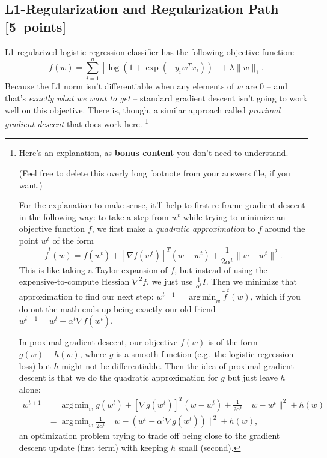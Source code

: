 \documentclass{article}
\newcommand\pts[1]{\textcolor{pointscolour}{[#1~points]}}
\DeclareMathOperator*{\argmin}{arg\,min}
\newcommand{\norm}[1]{\lVert #1 \rVert}
\begin{document}
\subsection{L1-Regularization and Regularization Path \pts{5}}
L1-regularized logistic regression classifier has the following objective function:
\[
f(w) = \sum_{i=1}^n \left[\log(1+\exp(-y_iw^Tx_i))\right] + \lambda\norm{w}_1.
\]
Because the L1 norm isn't differentiable when any elements of $w$ are $0$ -- and that's \emph{exactly what we want to get} -- standard gradient descent isn't going to work well on this objective.
There is, though, a similar approach called \emph{proximal gradient descent} that does work here.%
\footnote{%
    Here's an explanation, as \textbf{bonus content} you don't need to understand.

    (Feel free to delete this overly long footnote from your answers file, if you want.)

    For the explanation to make sense, it'll help to first re-frame gradient descent in the following way:
    to take a step from $w^t$ while trying to minimize an objective function $f$,
    we first make a \emph{quadratic approximation} to $f$ around the point $w^t$ of the form
    \[
        \tilde f^t(w) = f(w^t) + [\nabla f(w^t)]^T (w - w^t) + \frac{1}{2 \alpha^t} \norm{w - w^t}^2
    .\]
    This is like taking a Taylor expansion of $f$,
    but instead of using the expensive-to-compute Hessian $\nabla^2 f$,
    we just use $\frac{1}{\alpha^t} I$.
    Then we minimize that approximation to find our next step:
    $w^{t+1} = \argmin_{w} \tilde{f}^t(w)$,
    which if you do out the math ends up being exactly our old friend $w^{t+1} = w^t - \alpha^t \nabla f(w^t)$.\footnotemark

    In proximal gradient descent, our objective $f(w)$ is of the form $g(w) + h(w)$,
    where $g$ is a smooth function (e.g.\ the logistic regression loss)
    but $h$ might not be differentiable.
    Then the idea of proximal gradient descent is that we do the quadratic approximation for $g$ but just leave $h$ alone:
    \begin{align*}
         w^{t+1}
      &= \argmin_w g(w^t) + [\nabla g(w^t)]^T (w - w^t) + \frac{1}{2 \alpha^t} \norm{w - w^t}^2 + h(w)
    \\&= \argmin_w \frac{1}{2 \alpha^t} \norm{w - (w^t - \alpha^t \nabla g(w^t))}^2 + h(w)
    \tag{prox} \label{eq:prox}
    ,\end{align*}
    an optimization problem trying to trade off being close to the gradient descent update (first term) with keeping $h$ small (second).

}
\end{document}
